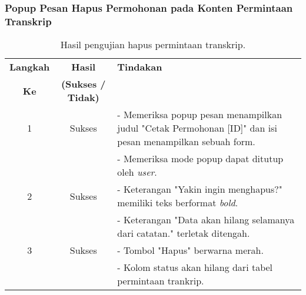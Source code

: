 \subsubsection{Popup Pesan Hapus Permohonan pada Konten Permintaan Transkrip}
\begin{table}[H]
	\centering 
	\caption{Hasil pengujian hapus permintaan transkrip.}
	\label{hasil:HapusPermintaanTranskrip}
	\begin{tabular}{|c| c| p{}|}
		\toprule
		\textbf{Langkah} & \textbf{Hasil} & \textbf{Tindakan}\\
		\textbf{Ke} & \textbf{(Sukses / Tidak)} &\\
		\midrule
		1&Sukses& - Memeriksa popup pesan menampilkan judul "Cetak Permohonan [ID]" dan isi pesan menampilkan sebuah form.\\
		&& - Memeriksa mode popup dapat ditutup oleh \textit{user}.\\
		\hline
		2&Sukses& - Keterangan "Yakin ingin menghapus?" memiliki teks berformat \textit{bold}. \\
		&& - Keterangan "Data akan hilang selamanya dari catatan." terletak ditengah.\\
		\hline
		3&Sukses&- Tombol "Hapus" berwarna merah.\\
		&& - Kolom status akan hilang dari tabel permintaan trankrip.\\		
		\bottomrule		
	\end{tabular} 
\end{table}

